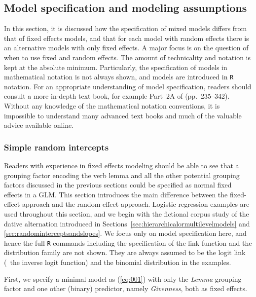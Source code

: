 \subsection{Model specification and modeling assumptions}
\label{sec:modelspecificationandmodelingassumptions}

In this section, it is discussed how the specification of mixed models differs from that of fixed effects models, and that for each model with random effects there is an alternative models with only fixed effects.
A major focus is on the question of when to use fixed and random effects.
The amount of technicality and notation is kept at the absolute minimum.
Particularly, the specification of models in mathematical notation is not always shown, and models are introduced in \texttt{R} notation.
For an appropriate understanding of model specification, readers should consult a more in-depth text book, for example Part~2A of \citet{GelmanHill2006} (pp.~235--342).
Without any knowledge of the mathematical notation conventions, it is impossible to understand many advanced text books and much of the valuable advice available online.

\subsubsection{Simple random intercepts}
\label{sec:simplerandomintercepts}

Readers with experience in fixed effects modeling should be able to see that a grouping factor encoding the verb lemma and all the other potential grouping factors discussed in the previous sections could be specified as normal fixed effects in a GLM.
This section introduces the main difference between the fixed-effect approach and the random-effect approach.
Logistic regression examples are used throughout this section, and we begin with the fictional corpus study of the dative alternation introduced in Sections~\ref{sec:hierarchicalormultilevelmodels} and \ref{sec:randominterceptsandslopes}.
We focus only on model specification here, and hence the full \texttt{R} commands including the specification of the link function and the distribution family are not shown.
They are always assumed to be the logit link (\ie\ the inverse logit function) and the binomial distribution in the examples.

First, we specify a minimal model as (\ref{eq:001}) with only the \textit{Lemma} grouping factor and one other (binary) predictor, namely \textit{Givenness}, both as fixed effects.


